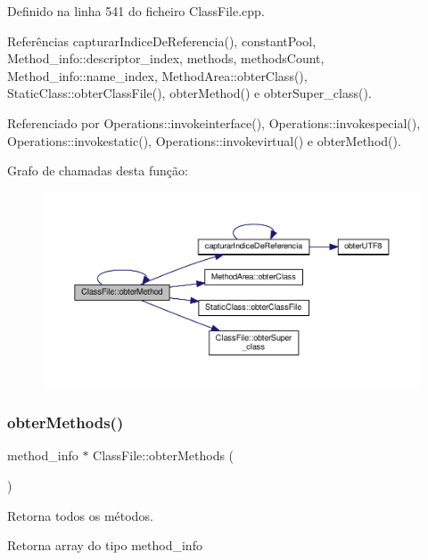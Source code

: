 Definido na linha 541 do ficheiro Class\+File.\+cpp.



Referências capturar\+Indice\+De\+Referencia(), constant\+Pool, Method\+\_\+info\+::descriptor\+\_\+index, methods, methods\+Count, Method\+\_\+info\+::name\+\_\+index, Method\+Area\+::obter\+Class(), Static\+Class\+::obter\+Class\+File(), obter\+Method() e obter\+Super\+\_\+class().



Referenciado por Operations\+::invokeinterface(), Operations\+::invokespecial(), Operations\+::invokestatic(), Operations\+::invokevirtual() e obter\+Method().

Grafo de chamadas desta função\+:
\nopagebreak
\begin{figure}[H]
\begin{center}
\leavevmode
\includegraphics[width=350pt]{classClassFile_aac49e7e39f677987b53fdf15787b8106_cgraph}
\end{center}
\end{figure}
\mbox{\label{classClassFile_a6ecce8d87f74c84b07f102c0298de13a}} 
\subsubsection{\texorpdfstring{obter\+Methods()}{obterMethods()}}
{\footnotesize\ttfamily method\+\_\+info $\ast$ Class\+File\+::obter\+Methods (\begin{DoxyParamCaption}{ }\end{DoxyParamCaption})}



Retorna todos os métodos. 

\begin{DoxyReturn}{Retorna}
array do tipo method\+\_\+info 
\end{DoxyReturn}


